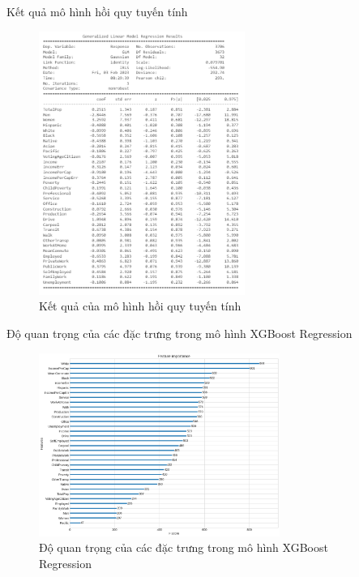 \documentclass[10pt]{beamer}
\theoremstyle{remark}
\theoremstyle{definition}
\begin{document}
\begin{frame}{Kết quả mô hình hồi quy tuyến tính}
	\begin{figure}[h!]
        \centering
        \includegraphics[width=0.6\textwidth]{figures/GLM_Result.png}
        \caption{Kết quả của mô hình hồi quy tuyến tính}
    \end{figure}
\end{frame}

\begin{frame}{Độ quan trọng của các đặc trưng trong mô hình XGBoost Regression}
	\begin{figure}[h!]
        \centering
        \includegraphics[width=0.7\textwidth]{figures/XGBoost_Regression_Feature_Importance.png}
        \caption{Độ quan trọng của các đặc trưng trong mô hình XGBoost Regression}
    \end{figure}
\end{frame}
\end{document}
